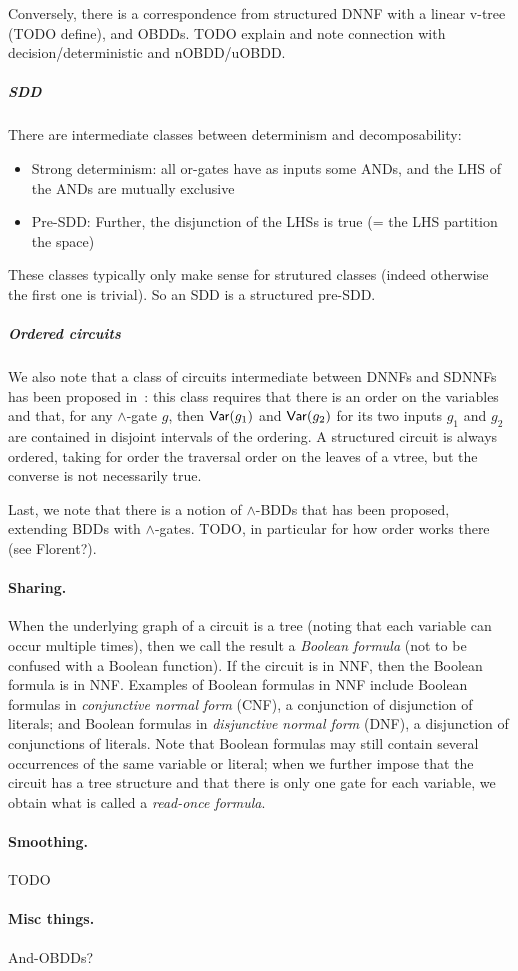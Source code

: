 Conversely, there is a correspondence from structured DNNF with a linear v-tree (TODO define), and OBDDs. TODO explain and note connection with decision/deterministic and nOBDD/uOBDD.

\subparagraph*{SDD} There are intermediate classes between determinism and decomposability:
\begin{itemize}
    \item Strong determinism: all or-gates have as inputs some ANDs, and the LHS of the ANDs are mutually exclusive
    \item Pre-SDD: Further, the disjunction of the LHSs is true (= the LHS partition the space)
\end{itemize}
These classes typically only make sense for strutured classes (indeed otherwise the first one is trivial). So an SDD is a structured pre-SDD.

\subparagraph*{Ordered circuits}
We also note that a class of circuits intermediate between DNNFs and SDNNFs has been proposed in~\cite{amarilli2017circuit}: this class requires that there is an order on the variables and that, for any $\land$-gate $g$, then $\mathsf{Var}(g_1)$ and $\mathsf{Var}(g_2)$ for its two inputs $g_1$ and $g_2$ are contained in disjoint intervals of the ordering. A structured circuit is always ordered, taking for order the traversal order on the leaves of a vtree, but the converse is not necessarily true.

Last, we note that there is a notion of $\land$-BDDs that has been proposed, extending BDDs with $\land$-gates. TODO, in particular for how order works there (see Florent?).

\paragraph*{Sharing.}
    When the underlying graph of a circuit is a tree (noting that each variable can occur multiple times), then we call the result a \emph{Boolean formula} (not to be confused with a Boolean function). If the circuit is in NNF, then the Boolean formula is in NNF. Examples of Boolean formulas in NNF include Boolean formulas in \emph{conjunctive normal form} (CNF), a conjunction of disjunction of literals; and Boolean formulas in \emph{disjunctive normal form} (DNF), a disjunction of conjunctions of literals. Note that Boolean formulas may still contain several occurrences of the same variable or literal; when we further impose that the circuit has a tree structure and that there is only one gate for each variable, we obtain what is called a \emph{read-once formula}.


\paragraph*{Smoothing.}
TODO

\paragraph*{Misc things.}
And-OBDDs?
